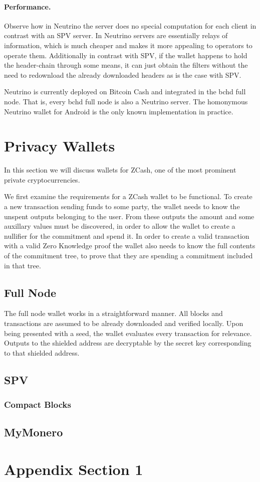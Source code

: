 \documentclass[sigconf]{acmart}
\begin{document}
\paragraph{Performance.} Observe how in Neutrino the server does no special computation for each client in contrast with an SPV server. In Neutrino servers are essentially relays of information, which is much cheaper and makes it more appealing to operators to operate them. Additionally in contrast with SPV, if the wallet happens to hold the header-chain through some means, it can just obtain the filters without the need to redownload the already downloaded headers as is the case with SPV.

Neutrino is currently deployed on Bitcoin Cash and integrated in the bchd full node.
That is, every bchd full node is also a Neutrino server.
The homonymous Neutrino wallet for Android is the only known implementation in practice.
\section{Privacy Wallets}
In this section we will discuss wallets for ZCash, one of the most prominent private cryptocurrencies.

We first examine the requirements for a ZCash wallet to be functional. To create a new transaction sending funds to some party, the wallet needs to know the unspent outputs belonging to the user. From these outputs the amount and some auxillary values must be discovered, in order to allow the wallet to create a nullifier for the commitment and spend it. In order to create a valid transaction with a valid Zero Knowledge proof the wallet also needs to know the full contents of the commitment tree, to prove that they are spending a commitment included in that tree.

\subsection{Full Node}
The full node wallet works in a straightforward manner. All blocks and transactions are assumed to be already downloaded and verified locally. Upon being presented with a seed, the wallet evaluates every transaction for relevance. Outputs to the shielded address are decryptable by the secret key corresponding to that shielded address.
\subsection{SPV}
\subsubsection{Compact Blocks}
\subsection{MyMonero}

\begin{acks}
\end{acks}




\appendix

\section{Appendix Section 1}
\end{document}
